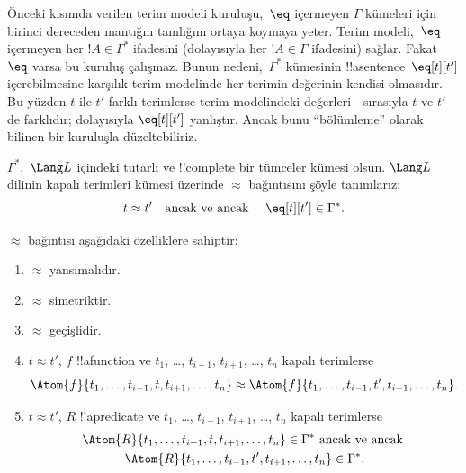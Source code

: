 \documentclass[../../../include/open-logic-section]{subfiles}
\begin{document}

\begin{explain}
Önceki kısımda verilen terim modeli kuruluşu,~$\eq$ içermeyen
$\Gamma$ kümeleri için birinci dereceden mantığın tamlığını ortaya
koymaya yeter. Terim modeli,~$\eq$ içermeyen her $!A\in\Gamma^*$
ifadesini (dolayısıyla her $!A\in\Gamma$ ifadesini) sağlar. Fakat
$\eq$ varsa bu kuruluş çalışmaz. Bunun nedeni,~$\Gamma^*$ kümesinin
!!a{sentence}~$\eq[t][t']$ içerebilmesine karşılık terim modelinde her
terimin değerinin kendisi olmasıdır. Bu yüzden $t$ ile $t'$ farklı
terimlerse terim modelindeki değerleri---sırasıyla $t$ ve $t'$---de
farklıdır; dolayısıyla $\eq[t][t']$ yanlıştır. Ancak bunu
``bölümleme'' olarak bilinen bir kuruluşla düzeltebiliriz.
\end{explain}

\begin{defn}
  $\Gamma^*$,~$\Lang L$ içindeki tutarlı ve !!{complete} bir tümceler
  kümesi olsun. $\Lang L$ dilinin kapalı terimleri kümesi üzerinde
  $\approx$ bağıntısını şöyle tanımlarız:
  \[
  t \approx t' \text{\quad ancak ve ancak \quad} \eq[t][t'] \in \Gamma^*.
  \]
\end{defn}

\begin{prop}
$\approx$ bağıntısı aşağıdaki özelliklere sahiptir:
\begin{enumerate}
\item $\approx$ yansımalıdır.
\item $\approx$ simetriktir.
\item $\approx$ geçişlidir.
\item $t\approx t'$, $f$ !!a{function} ve $t_1$, \dots,
  $t_{i-1}$, $t_{i+1}$, \dots, $t_n$ kapalı terimlerse
\[
\Atom{f}{t_1,\dots, t_{i-1}, t, t_{i+1}, \dots, t_n} \approx
\Atom{f}{t_1,\dots, t_{i-1}, t', t_{i+1}, \dots, t_n}.
\]
\item $t\approx t'$, $R$ !!a{predicate} ve $t_1$, \dots,
  $t_{i-1}$, $t_{i+1}$, \dots, $t_n$ kapalı terimlerse
\begin{multline*}
\Atom{R}{t_1,\dots, t_{i-1}, t, t_{i+1}, \dots, t_n} \in \Gamma^*
\text{ ancak ve ancak } \\
\Atom{R}{t_1,\dots, t_{i-1}, t', t_{i+1}, \dots, t_n} \in \Gamma^*.
\end{multline*}
\end{enumerate}
\end{prop}
\end{document}

